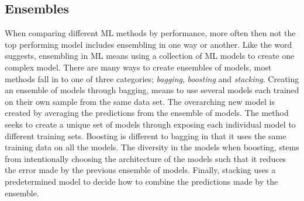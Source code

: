 \subsection{Ensembles}\label{subsec:Ensembles}
When comparing different \ac{ML} methods by performance, more often then not the top performing model includes 
ensembling in one way or another. Like the word suggests, ensembling in \ac{ML} means using a collection of 
\ac{ML} models to create one complex model. There are many ways to create ensembles of models, most methods 
fall in to one of three categories; \emph{bagging}, \emph{boosting} and \emph{stacking}. Creating an ensemble of models 
through bagging, means to use several models each trained on their own sample from the same data set. The overarching 
new model is created by averaging the predictions from the ensemble of models. The method seeks to create a unique set of 
models through exposing each individual model to different training sets. Boosting is different to bagging in that it uses 
the same training data on all the models. The diversity in the models when boosting, stems from intentionally choosing the 
architecture of the models such that it reduces the error made by the previous ensemble of models. Finally, stacking uses 
a predetermined model to decide how to combine the predictions made by the ensemble. 
  
